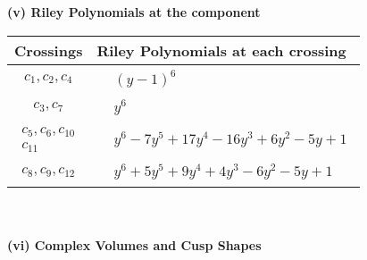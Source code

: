 \documentclass[1p]{elsarticle_modified}
\theoremstyle{definition}
\begin{document}
\newpage\renewcommand{\arraystretch}{1}
\flushleft \textbf{(v) Riley Polynomials at the component}\newline \\
\begin{tabular}{m{50pt}|m{274pt}}
Crossings & \hspace{64pt}Riley Polynomials at each crossing \\
\hline $$\begin{aligned}c_{1},c_{2},c_{4}\end{aligned}$$&$\begin{aligned}
&(y-1)^6
\end{aligned}$\\
\hline $$\begin{aligned}c_{3},c_{7}\end{aligned}$$&$\begin{aligned}
&y^6
\end{aligned}$\\
\hline $$\begin{aligned}c_{5},c_{6},c_{10}\\c_{11}\end{aligned}$$&$\begin{aligned}
&y^6-7 y^5+17 y^4-16 y^3+6 y^2-5 y+1
\end{aligned}$\\
\hline $$\begin{aligned}c_{8},c_{9},c_{12}\end{aligned}$$&$\begin{aligned}
&y^6+5 y^5+9 y^4+4 y^3-6 y^2-5 y+1
\end{aligned}$\\
\hline
\end{tabular}\\~\\
\newpage\flushleft \textbf{(vi) Complex Volumes and Cusp Shapes}
\end{document}
